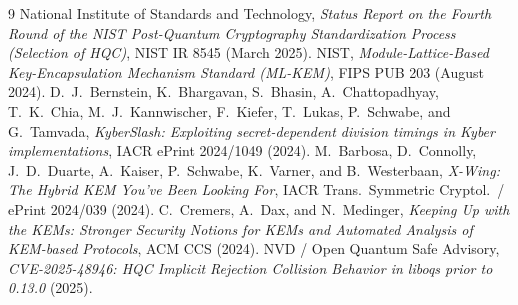 \documentclass[11pt,a4paper]{article}
\theoremstyle{plain}
\theoremstyle{remark}
\begin{document}
\clearpage
\begin{thebibliography}{9}
National Institute of Standards and Technology, \emph{Status Report on the Fourth Round of the NIST Post-Quantum Cryptography Standardization Process (Selection of HQC)}, NIST IR 8545 (March 2025).
NIST, \emph{Module-Lattice-Based Key-Encapsulation Mechanism Standard (ML-KEM)}, FIPS PUB 203 (August 2024).
D.~J.~Bernstein, K.~Bhargavan, S.~Bhasin, A.~Chattopadhyay, T.~K.~Chia, M.~J.~Kannwischer, F.~Kiefer, T.~Lukas, P.~Schwabe, and G.~Tamvada, \emph{KyberSlash: Exploiting secret-dependent division timings in Kyber implementations}, IACR ePrint 2024/1049 (2024).
M.~Barbosa, D.~Connolly, J.~D.~Duarte, A.~Kaiser, P.~Schwabe, K.~Varner, and B.~Westerbaan, \emph{X-Wing: The Hybrid KEM You've Been Looking For}, IACR Trans.\ Symmetric Cryptol.\ / ePrint 2024/039 (2024).
C.~Cremers, A.~Dax, and N.~Medinger, \emph{Keeping Up with the KEMs: Stronger Security Notions for KEMs and Automated Analysis of KEM-based Protocols}, ACM CCS (2024).
NVD / Open Quantum Safe Advisory, \emph{CVE-2025-48946: HQC Implicit Rejection Collision Behavior in liboqs prior to 0.13.0} (2025).
\end{thebibliography}
\end{document}
